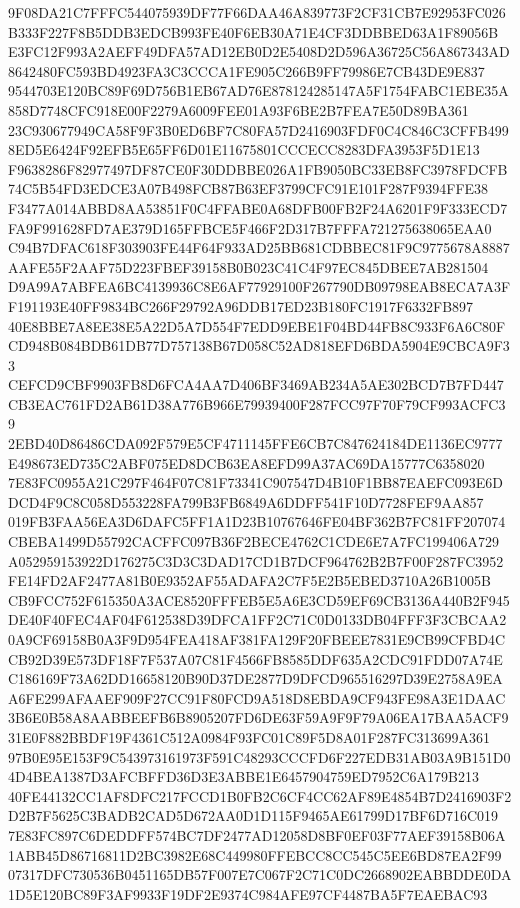 \documentclass[UTF8,fontset=fandol,zihao=-4,a4paper]{ctexart}
\begin{document}
{{9F08DA21C7FFFC544075939DF77F66DAA46A839773F2CF31CB7E92953FC026B333F227F8B5DDB3EDCB993FE40F6EB30A71E4CF3DDBBED63A1F89056B
E3FC12F993A2AEFF49DFA57AD12EB0D2E5408D2D596A36725C56A867343AD8642480FC593BD4923FA3C3CCCA1FE905C266B9FF79986E7CB43DE9E837
9544703E120BC89F69D756B1EB67AD76E878124285147A5F1754FABC1EBE35A858D7748CFC918E00F2279A6009FEE01A93F6BE2B7FEA7E50D89BA361
23C930677949CA58F9F3B0ED6BF7C80FA57D2416903FDF0C4C846C3CFFB4998ED5E6424F92EFB5E65FF6D01E11675801CCCECC8283DFA3953F5D1E13
F9638286F82977497DF87CE0F30DDBBE026A1FB9050BC33EB8FC3978FDCFB74C5B54FD3EDCE3A07B498FCB87B63EF3799CFC91E101F287F9394FFE38
F3477A014ABBD8AA53851F0C4FFABE0A68DFB00FB2F24A6201F9F333ECD7FA9F991628FD7AE379D165FFBCE5F466F2D317B7FFFA721275638065EAA0
C94B7DFAC618F303903FE44F64F933AD25BB681CDBBEC81F9C9775678A8887AAFE55F2AAF75D223FBEF39158B0B023C41C4F97EC845DBEE7AB281504
D9A99A7ABFEA6BC4139936C8E6AF77929100F267790DB09798EAB8ECA7A3FF191193E40FF9834BC266F29792A96DDB17ED23B180FC1917F6332FB897
40E8BBE7A8EE38E5A22D5A7D554F7EDD9EBE1F04BD44FB8C933F6A6C80FCD948B084BDB61DB77D757138B67D058C52AD818EFD6BDA5904E9CBCA9F33
CEFCD9CBF9903FB8D6FCA4AA7D406BF3469AB234A5AE302BCD7B7FD447CB3EAC761FD2AB61D38A776B966E79939400F287FCC97F70F79CF993ACFC39
2EBD40D86486CDA092F579E5CF4711145FFE6CB7C847624184DE1136EC9777E498673ED735C2ABF075ED8DCB63EA8EFD99A37AC69DA15777C6358020
7E83FC0955A21C297F464F07C81F73341C907547D4B10F1BB87EAEFC093E6DDCD4F9C8C058D553228FA799B3FB6849A6DDFF541F10D7728FEF9AA857
019FB3FAA56EA3D6DAFC5FF1A1D23B10767646FE04BF362B7FC81FF207074CBEBA1499D55792CACFFC097B36F2BECE4762C1CDE6E7A7FC199406A729
A052959153922D176275C3D3C3DAD17CD1B7DCF964762B2B7F00F287FC3952FE14FD2AF2477A81B0E9352AF55ADAFA2C7F5E2B5EBED3710A26B1005B
CB9FCC752F615350A3ACE8520FFFEB5E5A6E3CD59EF69CB3136A440B2F945DE40F40FEC4AF04F612538D39DFCA1FF2C71C0D0133DB04FFF3F3CBCAA2
0A9CF69158B0A3F9D954FEA418AF381FA129F20FBEEE7831E9CB99CFBD4CCB92D39E573DF18F7F537A07C81F4566FB8585DDF635A2CDC91FDD07A74E
C186169F73A62DD16658120B90D37DE2877D9DFCD965516297D39E2758A9EAA6FE299AFAAEF909F27CC91F80FCD9A518D8EBDA9CF943FE98A3E1DAAC
3B6E0B58A8AABBEEFB6B8905207FD6DE63F59A9F9F79A06EA17BAA5ACF931E0F882BBDF19F4361C512A0984F93FC01C89F5D8A01F287FC313699A361
97B0E95E153F9C543973161973F591C48293CCCFD6F227EDB31AB03A9B151D04D4BEA1387D3AFCBFFD36D3E3ABBE1E6457904759ED7952C6A179B213
40FE44132CC1AF8DFC217FCCD1B0FB2C6CF4CC62AF89E4854B7D2416903F2D2B7F5625C3BADB2CAD5D672AA0D1D115F9465AE61799D17BF6D716C019
7E83FC897C6DEDDFF574BC7DF2477AD12058D8BF0EF03F77AEF39158B06A1ABB45D86716811D2BC3982E68C449980FFEBCC8CC545C5EE6BD87EA2F99
07317DFC730536B0451165DB57F007E7C067F2C71C0DC2668902EABBDDE0DA1D5E120BC89F3AF9933F19DF2E9374C984AFE97CF4487BA5F7EAEBAC93
}}
\end{document}
